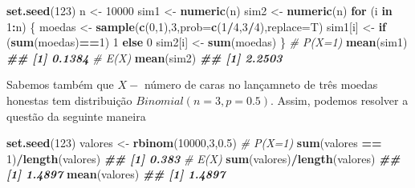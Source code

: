 \documentclass[
]{book}
\newenvironment{Shaded}{\begin{snugshade}}{\end{snugshade}}
\newcommand{\AttributeTok}[1]{\textcolor[rgb]{0.13,0.29,0.53}{#1}}
\newcommand{\CommentTok}[1]{\textcolor[rgb]{0.56,0.35,0.01}{\textit{#1}}}
\newcommand{\ControlFlowTok}[1]{\textcolor[rgb]{0.13,0.29,0.53}{\textbf{#1}}}
\newcommand{\DecValTok}[1]{\textcolor[rgb]{0.00,0.00,0.81}{#1}}
\newcommand{\DocumentationTok}[1]{\textcolor[rgb]{0.56,0.35,0.01}{\textbf{\textit{#1}}}}
\newcommand{\FloatTok}[1]{\textcolor[rgb]{0.00,0.00,0.81}{#1}}
\newcommand{\FunctionTok}[1]{\textcolor[rgb]{0.13,0.29,0.53}{\textbf{#1}}}
\newcommand{\NormalTok}[1]{#1}
\newcommand{\OtherTok}[1]{\textcolor[rgb]{0.56,0.35,0.01}{#1}}
\newcommand{\SpecialCharTok}[1]{\textcolor[rgb]{0.81,0.36,0.00}{\textbf{#1}}}
\begin{document}
\begin{Shaded}
\begin{Highlighting}[]
\FunctionTok{set.seed}\NormalTok{(}\DecValTok{123}\NormalTok{)}
\NormalTok{n }\OtherTok{\textless{}{-}} \DecValTok{10000}
\NormalTok{sim1 }\OtherTok{\textless{}{-}} \FunctionTok{numeric}\NormalTok{(n)}
\NormalTok{sim2 }\OtherTok{\textless{}{-}} \FunctionTok{numeric}\NormalTok{(n)}
\ControlFlowTok{for}\NormalTok{ (i }\ControlFlowTok{in} \DecValTok{1}\SpecialCharTok{:}\NormalTok{n) \{}
\NormalTok{  moedas }\OtherTok{\textless{}{-}} \FunctionTok{sample}\NormalTok{(}\FunctionTok{c}\NormalTok{(}\DecValTok{0}\NormalTok{,}\DecValTok{1}\NormalTok{),}\DecValTok{3}\NormalTok{,}\AttributeTok{prob=}\FunctionTok{c}\NormalTok{(}\DecValTok{1}\SpecialCharTok{/}\DecValTok{4}\NormalTok{,}\DecValTok{3}\SpecialCharTok{/}\DecValTok{4}\NormalTok{),}\AttributeTok{replace=}\NormalTok{T)}
\NormalTok{  sim1[i] }\OtherTok{\textless{}{-}} \ControlFlowTok{if}\NormalTok{ (}\FunctionTok{sum}\NormalTok{(moedas)}\SpecialCharTok{==}\DecValTok{1}\NormalTok{) }\DecValTok{1} \ControlFlowTok{else} \DecValTok{0}
\NormalTok{  sim2[i] }\OtherTok{\textless{}{-}} \FunctionTok{sum}\NormalTok{(moedas)}
\NormalTok{\}}
\CommentTok{\# P(X=1)}
\FunctionTok{mean}\NormalTok{(sim1)}
\DocumentationTok{\#\# [1] 0.1384}
\CommentTok{\# E(X)}
\FunctionTok{mean}\NormalTok{(sim2)}
\DocumentationTok{\#\# [1] 2.2503}
\end{Highlighting}
\end{Shaded}

Sabemos também que \(X-\) número de caras no lançamneto de três moedas
honestas tem distribuição \(Binomial(n=3,p=0.5)\). Assim, podemos resolver
a questão da seguinte maneira

\begin{Shaded}
\begin{Highlighting}[]
\FunctionTok{set.seed}\NormalTok{(}\DecValTok{123}\NormalTok{)}
\NormalTok{valores }\OtherTok{\textless{}{-}} \FunctionTok{rbinom}\NormalTok{(}\DecValTok{10000}\NormalTok{,}\DecValTok{3}\NormalTok{,}\FloatTok{0.5}\NormalTok{)}
\CommentTok{\# P(X=1)}
\FunctionTok{sum}\NormalTok{(valores }\SpecialCharTok{==} \DecValTok{1}\NormalTok{)}\SpecialCharTok{/}\FunctionTok{length}\NormalTok{(valores)}
\DocumentationTok{\#\# [1] 0.383}
\CommentTok{\# E(X)}
\FunctionTok{sum}\NormalTok{(valores)}\SpecialCharTok{/}\FunctionTok{length}\NormalTok{(valores)}
\DocumentationTok{\#\# [1] 1.4897}
\FunctionTok{mean}\NormalTok{(valores)}
\DocumentationTok{\#\# [1] 1.4897}
\end{Highlighting}
\end{Shaded}
\end{document}
